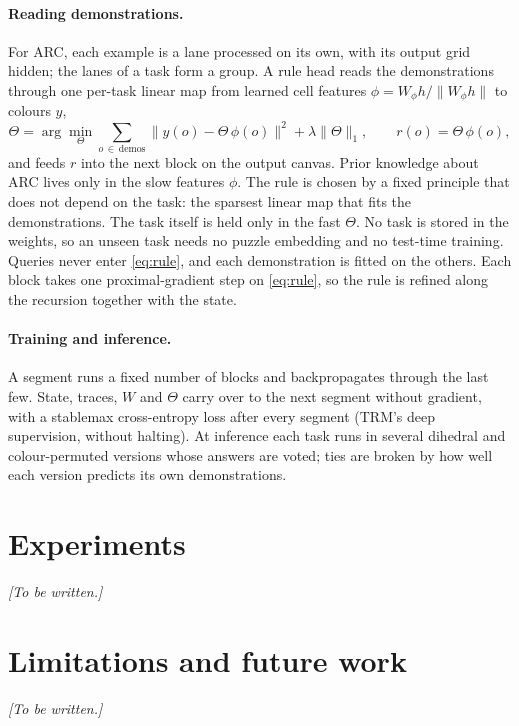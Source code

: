 \documentclass[10pt]{article}
\newcommand{\todo}[1]{\textit{[#1]}}
\begin{document}
\paragraph{Reading demonstrations.} For ARC, each example is a lane processed on its own, with its output grid hidden;
the lanes of a task form a group. A rule head reads the demonstrations through one per-task linear map from learned
cell features $\phi = W_\phi h / \lVert W_\phi h \rVert$ to colours $y$,
\begin{equation}
  \Theta = \arg\min_{\Theta} \sum_{o \,\in\, \mathrm{demos}} \big\lVert y(o) - \Theta\, \phi(o) \big\rVert^2
           + \lambda \lVert \Theta \rVert_1 , \qquad r(o) = \Theta\, \phi(o),
  \label{eq:rule}
\end{equation}
and feeds $r$ into the next block on the output canvas. Prior knowledge about ARC lives only in the slow features
$\phi$. The rule is chosen by a fixed principle that does not depend on the task: the sparsest linear map that fits the
demonstrations. The task itself is held only in the fast $\Theta$. No task is stored in the weights, so an unseen task
needs no puzzle embedding and no test-time training. Queries never enter \eqref{eq:rule}, and each demonstration is
fitted on the others. Each block takes one proximal-gradient step on \eqref{eq:rule}, so the rule is refined along the
recursion together with the state.

\paragraph{Training and inference.} A segment runs a fixed number of blocks and backpropagates through the last few.
State, traces, $W$ and $\Theta$ carry over to the next segment without gradient, with a stablemax cross-entropy loss
after every segment (TRM's deep supervision, without halting). At inference each task runs in several dihedral and
colour-permuted versions whose answers are voted; ties are broken by how well each version predicts its own
demonstrations.

\section{Experiments}
\label{sec:experiments}
\todo{To be written.}

\section{Limitations and future work}
\todo{To be written.}
\end{document}
